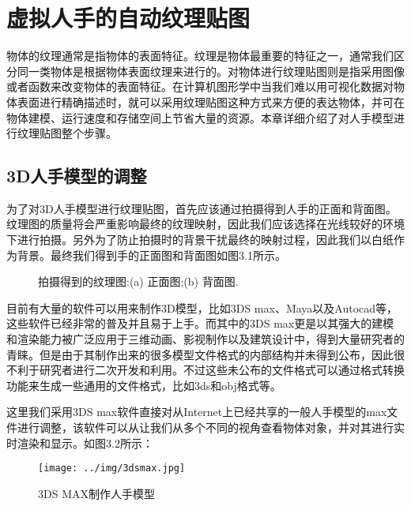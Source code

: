 \chapter{虚拟人手的自动纹理贴图}
\label{chap:faq}

物体的纹理通常是指物体的表面特征。纹理是物体最重要的特征之一，通常我们区分同一类物体是根据物体表面纹理来进行的。对物体进行纹理贴图则是指采用图像或者函数来改变物体的表面特征。在计算机图形学中当我们难以用可视化数据对物体表面进行精确描述时，就可以采用纹理贴图这种方式来方便的表达物体，并可在物体建模、运行速度和存储空间上节省大量的资源。本章详细介绍了对人手模型进行纹理贴图整个步骤。

\section{3D人手模型的调整}
为了对3D人手模型进行纹理贴图，首先应该通过拍摄得到人手的正面和背面图。纹理图的质量将会严重影响最终的纹理映射，因此我们应该选择在光线较好的环境下进行拍摄。另外为了防止拍摄时的背景干扰最终的映射过程，因此我们以白纸作为背景。最终我们得到手的正面图和背面图如图3.1所示。

\begin{figure}[htb]
\centering
{}%
%
\caption{拍摄得到的纹理图:(a) 正面图;(b) 背面图.}     
\end{figure}

目前有大量的软件可以用来制作3D模型，比如3DS
max、Maya以及Autocad等，这些软件已经非常的普及并且易于上手。而其中的3DS
max更是以其强大的建模和渲染能力被广泛应用于三维动画、影视制作以及建筑设计中，得到大量研究者的青睐。但是由于其制作出来的很多模型文件格式的内部结构并未得到公布，因此很不利于研究者进行二次开发和利用。不过这些未公布的文件格式可以通过格式转换功能来生成一些通用的文件格式，比如3ds和obj格式等。

这里我们采用3DS
max软件直接对从Internet上已经共享的一般人手模型的max文件进行调整，该软件可以从让我们从多个不同的视角查看物体对象，并对其进行实时渲染和显示。如图3.2所示：

\begin{figure}[htb]
\centering
\texttt{[image: ../img/3dsmax.jpg]}
\caption{3DS MAX制作人手模型}
\label{fig：graph}
\end{figure} 

